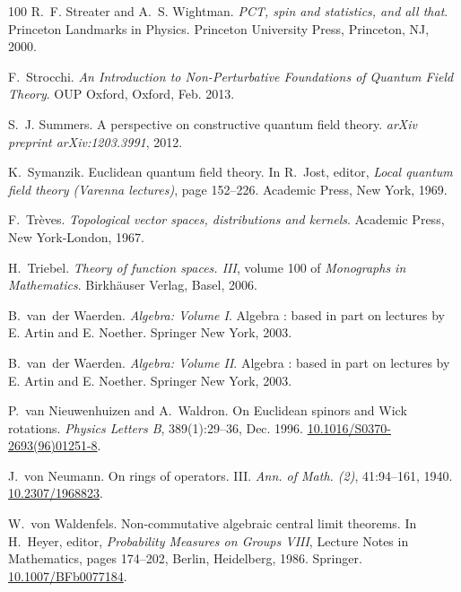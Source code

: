 \documentclass[11pt]{article}
\newcommand{\tmtextit}[1]{{\itshape{#1}}}
\begin{document}
\begin{thebibliography}{100}
  R.~F. Streater and A.~S. Wightman.
  {\newblock}\tmtextit{PCT, spin and statistics, and all that}.
  {\newblock}Princeton Landmarks in Physics. Princeton University Press,
  Princeton, NJ, 2000.
  
  F.~Strocchi.
  {\newblock}\tmtextit{An Introduction to Non-Perturbative Foundations of
  Quantum Field Theory}. {\newblock}OUP Oxford, Oxford, Feb. 2013.
  
  S.~J. Summers. {\newblock}A perspective
  on constructive quantum field theory. {\newblock}\tmtextit{arXiv preprint
  arXiv:1203.3991}, 2012.
  
  K.~Symanzik. {\newblock}Euclidean quantum field
  theory. {\newblock}In R.~Jost, editor, \tmtextit{Local quantum field theory
  (Varenna lectures)}, page 152--226. Academic Press, New York, 1969.
  
  F.~Tr{\`e}ves. {\newblock}\tmtextit{Topological vector
  spaces, distributions and kernels}. {\newblock}Academic Press, New
  York-London, 1967.
  
  H.~Triebel. {\newblock}\tmtextit{Theory of function
  spaces. III}, volume 100 of \tmtextit{Monographs in Mathematics}.
  {\newblock}Birkh{\"a}user Verlag, Basel, 2006.
  
  B.~van~der Waerden.
  {\newblock}\tmtextit{Algebra: Volume I}. {\newblock}Algebra : based in part
  on lectures by E. Artin and E. Noether. Springer New York, 2003.
  
  B.~van~der Waerden.
  {\newblock}\tmtextit{Algebra: Volume II}. {\newblock}Algebra : based in part
  on lectures by E. Artin and E. Noether. Springer New York, 2003.
  
  P.~van Nieuwenhuizen and
  A.~Waldron. {\newblock}On Euclidean spinors and Wick rotations.
  {\newblock}\tmtextit{Physics Letters B}, 389(1):29--36, Dec. 1996.
  {\newblock}
  \href{https://doi.org/10.1016/S0370-2693(96)01251-8}{10.1016/S0370-2693(96)01251-8}.
  
  J.~von Neumann. {\newblock}On rings of operators.
  III. {\newblock}\tmtextit{Ann. of Math. (2)}, 41:94--161, 1940.
  {\newblock}\href{https://doi.org/10.2307/1968823}{10.2307/1968823}.
  
  W.~von Waldenfels.
  {\newblock}Non-commutative algebraic central limit theorems. {\newblock}In
  H.~Heyer, editor, \tmtextit{Probability Measures on Groups VIII}, Lecture
  Notes in Mathematics, pages 174--202, Berlin, Heidelberg, 1986. Springer.
  {\newblock}\href{https://doi.org/10.1007/BFb0077184}{10.1007/BFb0077184}.
  

\end{thebibliography}
\end{document}
